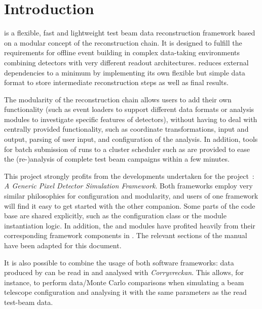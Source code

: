 \chapter{Introduction}
\label{ch:introduction}

\corry is a flexible, fast and lightweight test beam data reconstruction framework based on a modular concept of the reconstruction chain.
It is designed to fulfill the requirements for offline event building in complex data-taking environments combining detectors with very different readout architectures.
\corry reduces external dependencies to a minimum by implementing its own flexible but simple data format to store intermediate reconstruction steps as well as final results.

The modularity of the reconstruction chain allows users to add their own functionality (such as event loaders to support different data formats or analysis modules to investigate specific features of detectors), without having to deal with centrally provided functionality, such as coordinate transformations, input and output, parsing of user input, and configuration of the analysis.
In addition, tools for batch submission of runs to a cluster scheduler such as  are provided to ease the (re-)analysis of complete test beam campaigns within a few minutes.

This project strongly profits from the developments undertaken for the \apsq project~\cite{apsq,apsq-website}: \emph{A Generic Pixel Detector Simulation Framework}.
Both frameworks employ very similar philosophies for configuration and modularity, and users of one framework will find it easy to get started with the other companion.
Some parts of the code base are shared explicitly, such as the configuration class or the module instantiation logic.
In addition, the  and  modules have profited heavily from their corresponding framework components in \apsq.
The relevant sections of the \apsq manual~\cite{apsq-manual,clicdp-apsq-manual} have been adapted for this document.

It is also possible to combine the usage of both software frameworks: data produced by \apsq can be read in and analysed with \textit{Corryvreckan}.
This allows, for instance, to perform data/Monte Carlo comparisons when simulating a beam telescope configuration and analysing it with the same parameters as the read test-beam data.

